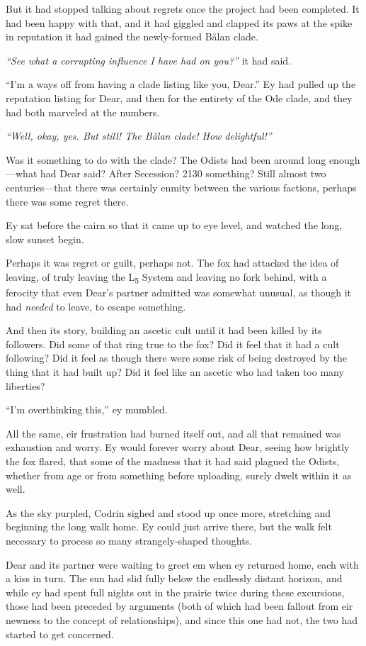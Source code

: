 But it had stopped talking about regrets once the project had been completed. It had been happy with that, and it had giggled and clapped its paws at the spike in reputation it had gained the newly-formed Bălan clade.

\emph{``See what a corrupting influence I have had on you?''} it had said.

``I'm a ways off from having a clade listing like you, Dear.'' Ey had pulled up the reputation listing for Dear, and then for the entirety of the Ode clade, and they had both marveled at the numbers.

\emph{``Well, okay, yes. But still! The Bălan clade! How delightful!''}

Was it something to do with the clade? The Odists had been around long enough---what had Dear said? After Secession? 2130 something? Still almost two centuries---that there was certainly enmity between the various factions, perhaps there was some regret there.

Ey sat before the cairn so that it came up to eye level, and watched the long, slow sunset begin.

Perhaps it was regret or guilt, perhaps not. The fox had attacked the idea of leaving, of truly leaving the L\textsubscript{5} System and leaving no fork behind, with a ferocity that even Dear's partner admitted was somewhat unusual, as though it had \emph{needed} to leave, to escape something.

And then its story, building an ascetic cult until it had been killed by its followers. Did some of that ring true to the fox? Did it feel that it had a cult following? Did it feel as though there were some risk of being destroyed by the thing that it had built up? Did it feel like an ascetic who had taken too many liberties?

``I'm overthinking this,'' ey mumbled.

All the same, eir frustration had burned itself out, and all that remained was exhaustion and worry. Ey would forever worry about Dear, seeing how brightly the fox flared, that some of the madness that it had said plagued the Odists, whether from age or from something before uploading, surely dwelt within it as well.

As the sky purpled, Codrin sighed and stood up once more, stretching and beginning the long walk home. Ey could just arrive there, but the walk felt necessary to process so many strangely-shaped thoughts.

Dear and its partner were waiting to greet em when ey returned home, each with a kiss in turn. The sun had slid fully below the endlessly distant horizon, and while ey had spent full nights out in the prairie twice during these excursions, those had been preceded by arguments (both of which had been fallout from eir newness to the concept of relationships), and since this one had not, the two had started to get concerned.

